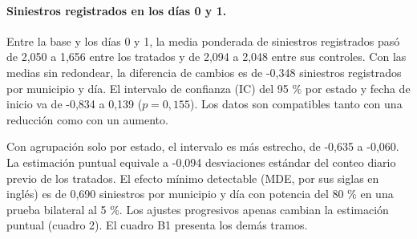 \documentclass[11pt,letterpaper]{article}
\begin{document}
\paragraph{Siniestros registrados en los días 0 y 1.}

Entre la base y los días 0 y 1, la media ponderada de siniestros registrados pasó de 2,050 a 1,656 entre los tratados y de 2,094 a 2,048 entre sus controles. Con las medias sin redondear, la diferencia de cambios es de -0,348 siniestros registrados por municipio y día. El intervalo de confianza (IC) del 95 \% por estado y fecha de inicio va de -0,834 a 0,139 ($p=0{,}155$). Los datos son compatibles tanto con una reducción como con un aumento.\par

Con agrupación solo por estado, el intervalo es más estrecho, de -0,635 a -0,060. La estimación puntual equivale a -0,094 desviaciones estándar del conteo diario previo de los tratados. El efecto mínimo detectable (MDE, por sus siglas en inglés) es de 0,690 siniestros por municipio y día con potencia del 80 \% en una prueba bilateral al 5 \%. Los ajustes progresivos apenas cambian la estimación puntual (cuadro 2). El cuadro B1 presenta los demás tramos.\par
\end{document}
